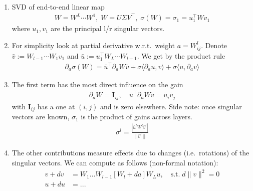 \documentclass{article}
\begin{document}
\begin{enumerate}
\item SVD of end-to-end linear map 
\begin{align}
W= W^L  \cdots W^1, \; W = U \Sigma V^\top, \; \sigma(W) = \sigma_1 = u_1^\top W v_1
\end{align}
where $u_1,v_1$ are the principal l/r singular vectors.\\
\item For simplicity look at partial derivative w.r.t.~weight $a=W^l_{ij}$. Denote $\bar v := W_{l-1} \cdots W_1 v_1$ and $\bar u :=  u_1^\top W_L \cdots W_{l+1}$. We get by the product rule
\begin{align}
\partial_a \sigma(W) = 
	\bar u^\top \partial_a W \bar v
	+ 
	\sigma  \langle \partial_a u,  v\rangle
	+
	\sigma \langle u, \partial_a v \rangle
\end{align}
\item The first term has the most direct influence on the gain 
\begin{align}
\partial_a W = \mathbf I_{ij}, \quad 
 \bar u^\top \partial_a W \bar v= \bar u_i \bar v_j
\end{align}
with $\mathbf I_{ij} $ has a one at $(i,j)$ and is zero elsewhere. Side note: once singular vectors are known, $\sigma_1$ is the product of gains across layers. 
\begin{align}
\sigma^l = \frac{| \bar u^l W^l \bar v^l |}{\|\bar v^l\|}
\end{align}
\item The other contributions measure effects due to changes (i.e.~rotations) of the singular vectors. We can compute as follows (non-formal notation):
\begin{align}
v+dv & = W_{1}\dots W_{l-1}  \left[ W_{l} + da \right] W_{L} u, \quad \text{s.t.} \; d\|v\|^2 =0 \\
u+ du & = ...
\end{align}
\end{enumerate}
\end{document}
